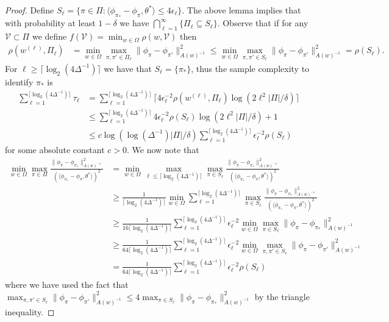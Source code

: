 \documentclass{article}
\newcommand{\mc}[1]{\mathcal{#1}}
\newcommand{\1}{\mathbf{1}}
\begin{document}
\begin{proof}
Define $S_\ell = \{ \pi \in \Pi : \langle \phi_{\pi_*} - \phi_\pi , \theta^* \rangle \leq 4 \epsilon_\ell \}$.
The above lemma implies that with probability at least $1-\delta$ we have $\bigcap_{\ell=1}^\infty \{ \Pi_\ell \subseteq S_\ell \}$.
Observe that if for any $\mc{V} \subset \Pi$ we define $f(\mc{V}) = \min_{w \in \Omega} \rho(w,\mc{V})$ then
\begin{align*}
\rho(w^{(\ell)}, \Pi_\ell) &= \min_{w \in \Omega} \max_{\pi,\pi' \in \Pi_{\ell}}  \| \phi_\pi - \phi_{\pi'} \|_{A(w)^{-1}}^2 \leq \min_{w \in \Omega} \max_{\pi,\pi' \in S_{\ell}}  \| \phi_\pi - \phi_{\pi'} \|_{A(w)^{-1}}^2 = \rho(S_\ell).
\end{align*}
For $\ell \geq \lceil \log_2(4\Delta^{-1}) \rceil$ we have that $S_\ell = \{ \pi_* \}$, thus the sample complexity to identify $\pi_*$ is
\begin{align*}
\sum_{\ell=1}^{\lceil \log_2(4\Delta^{-1}) \rceil} \tau_\ell 
&= \sum_{\ell=1}^{\lceil \log_2(4\Delta^{-1}) \rceil} \lceil 4 \epsilon_\ell^{-2} \rho( w^{(\ell)}, \Pi_\ell ) \log(2 \ell^2|\Pi|/\delta) \rceil \\
&\leq \sum_{\ell=1}^{\lceil \log_2(4\Delta^{-1}) \rceil} 4 \epsilon_\ell^{-2} \rho(S_\ell) \log(2 \ell^2 |\Pi| /\delta) +1\\
&\leq c \log( \log(\Delta^{-1}) |\Pi| /\delta) \sum_{\ell=1}^{\lceil \log_2(4\Delta^{-1}) \rceil}  \epsilon_\ell^{-2} \rho(S_\ell) 
\end{align*}
for some absolute constant $c > 0$.
We now note that
\begin{align*}
\min_{w \in\Omega}\max_{\pi \in \Pi} \frac{\|\phi_\pi-\phi_{\pi_*}\|_{A(w)^{-1}}^2}{(\langle \phi_{\pi_*}-\phi_\pi , \theta^* \rangle)^2} 
&= \min_{w \in\Omega}  \max_{\ell \leq \lceil \log_2(4\Delta^{-1})\rceil} \max_{\pi \in S_\ell} \frac{\|\phi_\pi-\phi_{\pi_*}\|_{A(w)^{-1}}^2}{(\langle \phi_{\pi_*}-\phi_\pi , \theta^* \rangle)^2} \\
&\geq \frac{1}{\lceil \log_2(4\Delta^{-1})\rceil} \min_{w \in\Omega} \sum_{\ell=1}^{\lceil \log_2(4\Delta^{-1}) \rceil} \max_{\pi \in S_\ell} \frac{\|\phi_\pi-\phi_{\pi_*}\|_{A(w)^{-1}}^2}{(\langle \phi_{\pi_*}-\phi_\pi , \theta^* \rangle)^2} \\
&\geq \frac{1}{16 \lceil \log_2(4\Delta^{-1})\rceil}  \sum_{\ell=1}^{\lceil \log_2(4\Delta^{-1}) \rceil} \epsilon_\ell^{-2} \min_{w \in\Omega} \max_{\pi \in S_\ell} \|\phi_\pi-\phi_{\pi_*}\|_{A(w)^{-1}}^2 \\
&\geq \frac{1}{64 \lceil \log_2(4\Delta^{-1})\rceil}  \sum_{\ell=1}^{\lceil \log_2(4\Delta^{-1}) \rceil} \epsilon_\ell^{-2} \min_{w \in\Omega} \max_{\pi,\pi' \in S_\ell} \|\phi_\pi-\phi_{\pi'}\|_{A(w)^{-1}}^2 \\
&= \frac{1}{64 \lceil \log_2(4\Delta^{-1})\rceil}  \sum_{\ell=1}^{\lceil \log_2(4\Delta^{-1}) \rceil} \epsilon_\ell^{-2} \rho(S_\ell) 
\end{align*}
where we have used the fact that $\max_{\pi,\pi' \in S_\ell} \|\phi_\pi-\phi_{\pi'}\|_{A(w)^{-1}}^2 \leq 4 \max_{\pi \in S_\ell} \|\phi_\pi-\phi_{\pi_*}\|_{A(w)^{-1}}^2$ by the triangle inequality.
\end{proof}
\end{document}
